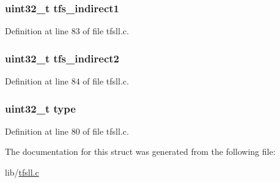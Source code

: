 \subsubsection[{tfs\+\_\+indirect1}]{\setlength{\rightskip}{0pt plus 5cm}uint32\+\_\+t tfs\+\_\+indirect1}\label{structtfs__ftent_acf7d5c649c8c0f9cec2a1ed197b3ff4c}


Definition at line 83 of file tfsll.\+c.

\hypertarget{structtfs__ftent_ae66fa913e290bb96328acf2933ef3825}{}
\subsubsection[{tfs\+\_\+indirect2}]{\setlength{\rightskip}{0pt plus 5cm}uint32\+\_\+t tfs\+\_\+indirect2}\label{structtfs__ftent_ae66fa913e290bb96328acf2933ef3825}


Definition at line 84 of file tfsll.\+c.

\hypertarget{structtfs__ftent_ad44b615021ed3ccb734fcaf583ef4a03}{}
\subsubsection[{type}]{\setlength{\rightskip}{0pt plus 5cm}uint32\+\_\+t type}\label{structtfs__ftent_ad44b615021ed3ccb734fcaf583ef4a03}


Definition at line 80 of file tfsll.\+c.



The documentation for this struct was generated from the following file\+:\begin{DoxyCompactItemize}
\item 
lib/\hyperlink{tfsll_8c}{tfsll.\+c}\end{DoxyCompactItemize}

